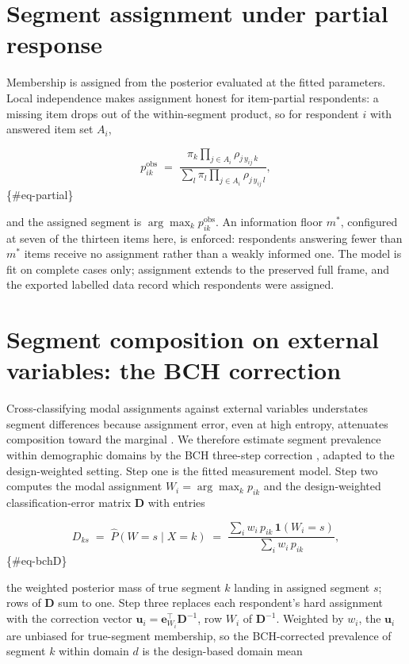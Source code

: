 \documentclass[
  12pt]{article}
\begin{document}
\section{Segment assignment under partial
response}\label{sec-assignment}

Membership is assigned from the posterior evaluated at the fitted
parameters. Local independence makes assignment honest for item-partial
respondents: a missing item drops out of the within-segment product, so
for respondent \(i\) with answered item set \(A_i\),

\[p_{ik}^{\mathrm{obs}} \;=\;
\frac{\pi_k \prod_{j \in A_i} \rho_{j\,y_{ij}\,k}}
{\sum_l \pi_l \prod_{j \in A_i} \rho_{j\,y_{ij}\,l}},\] \{\#eq-partial\}

and the assigned segment is \(\arg\max_k p_{ik}^{\mathrm{obs}}\). An
information floor \(m^{*}\), configured at seven of the thirteen items
here, is enforced: respondents answering fewer than \(m^{*}\) items
receive no assignment rather than a weakly informed one. The model is
fit on complete cases only; assignment extends to the preserved full
frame, and the exported labelled data record which respondents were
assigned.

\section{Segment composition on external variables: the BCH
correction}\label{sec-bch}

Cross-classifying modal assignments against external variables
understates segment differences because assignment error, even at high
entropy, attenuates composition toward the marginal \citep{bolck2004}.
We therefore estimate segment prevalence within demographic domains by
the BCH three-step correction \citep{bolck2004, vermunt2010}, adapted to
the design-weighted setting. Step one is the fitted measurement model.
Step two computes the modal assignment \(W_i = \arg\max_k p_{ik}\) and
the design-weighted classification-error matrix \(\mathbf{D}\) with
entries

\[D_{ks} \;=\; \widehat{P}(W = s \mid X = k) \;=\;
\frac{\sum_i w_i\, p_{ik}\, \mathbf{1}(W_i = s)}{\sum_i w_i\, p_{ik}},\]
\{\#eq-bchD\}

the weighted posterior mass of true segment \(k\) landing in assigned
segment \(s\); rows of \(\mathbf{D}\) sum to one. Step three replaces
each respondent's hard assignment with the correction vector
\(\mathbf{u}_i = \mathbf{e}_{W_i}^{\top} \mathbf{D}^{-1}\), row \(W_i\)
of \(\mathbf{D}^{-1}\). Weighted by \(w_i\), the \(\mathbf{u}_i\) are
unbiased for true-segment membership, so the BCH-corrected prevalence of
segment \(k\) within domain \(d\) is the design-based domain mean
\end{document}
